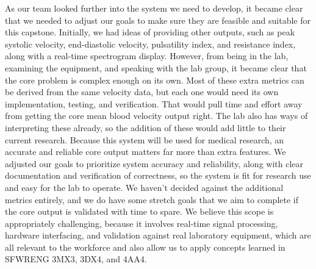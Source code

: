 \documentclass{article}
\begin{document}
\begin{enumerate}
    As our team looked further into the system we need to develop, it became
    clear that we needed to adjust our goals to make sure they are feasible and
    suitable for this capstone. Initially, we had ideas of providing other
    outputs, such as peak systolic velocity, end-diastolic velocity, pulsatility
    index, and resistance index, along with a real-time spectrogram display.
    However, from being in the lab, examining the equipment, and speaking with
    the lab group, it became clear that the core problem is complex enough on
    its own. Most of these extra metrics can be derived from the same velocity
    data, but each one would need its own implementation, testing, and
    verification. That would pull time and effort away from getting the core
    mean blood velocity output right. The lab also has ways of interpreting
    these already, so the addition of these would add little to their current
    research. Because this system will be used for medical research, an
    accurate and reliable core output matters far more than extra features. We
    adjusted our goals to prioritize system accuracy and reliability, along with
    clear documentation and verification of correctness, so the system is fit
    for research use and easy for the lab to operate. We haven't decided against
    the additional metrics entirely, and we do have some stretch goals that we
    aim to complete if the core output is validated with time to spare. We
    believe this scope is appropriately challenging, because it involves
    real-time signal processing, hardware interfacing, and validation against
    real laboratory equipment, which are all relevant to the workforce and also
    allow us to apply concepts learned in SFWRENG 3MX3, 3DX4, and 4AA4.
\end{enumerate}  
\end{document}
